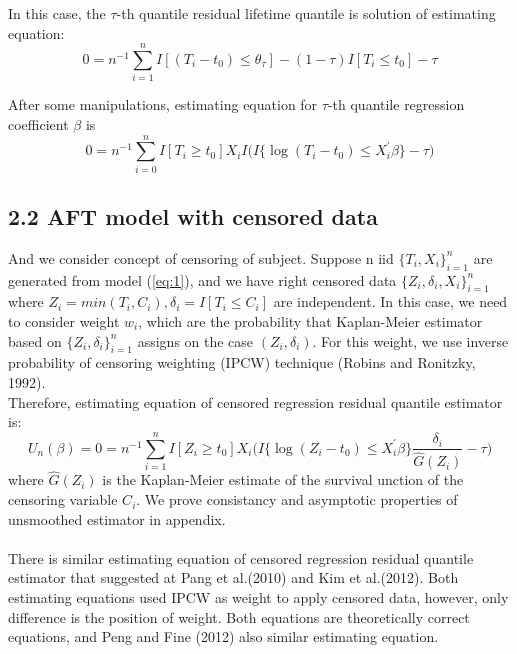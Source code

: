 \documentclass[12pt]{article}
\begin{document}
	\noindent In this case, the $\tau$-th quantile residual lifetime quantile is solution of estimating equation:
	\begin{equation} \label{eq:2}
	0 = n^{-1}\sum_{i=1}^{n}I[(T_i-t_0)\leq\theta_{\tau}]-(1-\tau)I[T_i \leq t_0]-\tau
	\end{equation}

	\noindent After some manipulations, estimating equation for $\tau$-th quantile regression coefficient $\beta$ is
	\begin{equation} \label{eq:3}
	0 = n^{-1}\sum_{i=0}^{n}I[T_i \ge t_0] X_i I \Big(I\{\log(T_i - t_0) \leq X_i^{\prime}\beta\} - \tau \Big)
	\end{equation}

\subsection{2.2 AFT model with censored data}
	\noindent And we consider concept of censoring of subject. Suppose n iid $\{T_i, X_i\}_{i=1}^{n}$ are generated from model (\ref{eq:1}), and we have right censored data $\{Z_i, \delta_i, X_i \}_{i=1}^{n}$ where $Z_i=min(T_i,C_i), \delta_i = I[T_i \leq C_i]$ are independent. In this case, we need to consider weight $w_i$, which are the probability that Kaplan-Meier estimator based on $\{Z_i, \delta_i \}_{i=1}^{n}$ assigns on the case $(Z_i, \delta_i)$. For this weight, we use inverse probability of censoring weighting (IPCW) technique (Robins and Ronitzky, 1992).\\
	
	\noindent Therefore, estimating equation of censored regression residual quantile estimator is:
	\begin{equation} \label{eq:4}
	U_n(\beta) = 0 = n^{-1}\sum_{i=1}^{n}I[Z_i \ge t_0] X_i \Big(I\{\log(Z_i - t_0) \leq X_i^{\prime}\beta\} \frac{\delta_i}{\hat{G}(Z_i)}  -\tau \Big)
	\end{equation}
	where $\hat{G}(Z_i)$ is the Kaplan-Meier estimate of the survival unction of the censoring variable $C_i$. We prove consistancy and asymptotic properties of unsmoothed estimator in appendix.\\
	\\
	There is similar estimating equation of censored regression residual quantile estimator that suggested at Pang et al.(2010) and Kim et al.(2012). Both estimating equations used IPCW as weight to apply censored data, however, only difference is the position of weight. Both equations are theoretically correct equations, and Peng and Fine (2012) also similar estimating equation.\\
\end{document}
